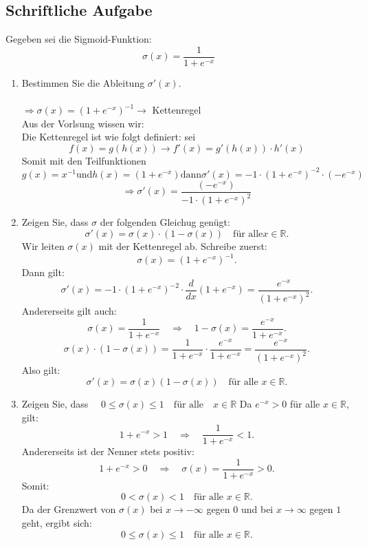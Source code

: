 \documentclass[a4paper]{article}
\begin{document}
\subsection{Schriftliche Aufgabe}
Gegeben sei die Sigmoid-Funktion:
\[
\sigma(x) = \frac{1}{1 + e^{-x}}
\]
\begin{enumerate}[label=(\alph*)]
    \item Bestimmen Sie die Ableitung $\sigma'(x)$.\\\\
    \(\Rightarrow\sigma(x) = (1 + e^{-x})^{-1} \rightarrow\) Kettenregel\\
    Aus der Vorlsung wissen wir:\\
    Die Kettenregel ist wie folgt definiert: sei
    \[
    f(x) = g(h(x)) \rightarrow f'(x) = g'(h(x)) \cdot h'(x)
    \]
    Somit mit den Teilfunktionen
    \[
    g(x) = x^{-1} \text{und} h(x) = (1 + e^{-x}) \text{dann} \sigma'(x) = -1 \cdot (1 + e^{-x})^{-2} \cdot (-e^{-x})
    \]
    \[
    \Rightarrow \sigma'(x) = \frac{(-e^{-x})}{-1 \cdot (1 + e^{-x})^{2}}
    \]
    \item Zeigen Sie, dass $\sigma$ der folgenden Gleichug genügt:
    \[
    \sigma'(x) = \sigma(x) \cdot (1 - \sigma(x)) \quad \text{für alle} x \in \mathbb{R}.
    \]
    Wir leiten $\sigma(x)$ mit der Kettenregel ab. Schreibe zuerst:
    \[
    \sigma(x) = (1 + e^{-x})^{-1}.
    \]
    Dann gilt:
    \[
    \sigma'(x) = -1 \cdot (1 + e^{-x})^{-2} \cdot \frac{d}{dx}(1 + e^{-x}) = \frac{e^{-x}}{(1 + e^{-x})^2}.
    \]
    Andererseits gilt auch:
    \[
    \sigma(x) = \frac{1}{1 + e^{-x}} \quad \Rightarrow \quad 1 - \sigma(x) = \frac{e^{-x}}{1 + e^{-x}}.
    \]
    \[
    \sigma(x) \cdot (1 - \sigma(x)) = \frac{1}{1 + e^{-x}} \cdot \frac{e^{-x}}{1 + e^{-x}} = \frac{e^{-x}}{(1 + e^{-x})^2}.
    \]
    Also gilt:
    \[
    \sigma'(x) = \sigma(x)(1 - \sigma(x)) \quad \text{für alle } x \in \mathbb{R}.
    \]
    \item Zeigen Sie, dass \(\quad 0 \leq \sigma(x) \leq 1 \quad \text{für alle} \quad x \in \mathbb{R}\)
    Da \( e^{-x} > 0 \) für alle \( x \in \mathbb{R} \), gilt:
    \[
    1 + e^{-x} > 1 \quad \Rightarrow \quad \frac{1}{1 + e^{-x}} < 1.
    \]
    Andererseits ist der Nenner stets positiv:
    \[
    1 + e^{-x} > 0 \quad \Rightarrow \quad \sigma(x) = \frac{1}{1 + e^{-x}} > 0.
    \]
    Somit:
    \[
    0 < \sigma(x) < 1 \quad \text{für alle } x \in \mathbb{R}.
    \]
    Da der Grenzwert von \( \sigma(x) \) bei \( x \to -\infty \) gegen \( 0 \) und bei \( x \to \infty \) gegen \( 1 \) geht, ergibt sich:
    \[
    0 \leq \sigma(x) \leq 1 \quad \text{für alle } x \in \mathbb{R}.
    \]
\end{enumerate}
\end{document}
